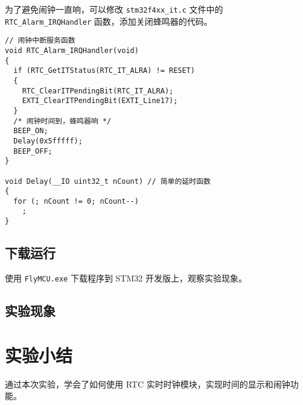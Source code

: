 \documentclass{course-thesis/theme-2639013}
\begin{document}
为了避免闹钟一直响，可以修改 \texttt{stm32f4xx\_it.c} 文件中的 \texttt{ RTC\_Alarm\_IRQHandler} 函数，添加关闭蜂鸣器的代码。

\begin{verbatim}
// 闹钟中断服务函数
void RTC_Alarm_IRQHandler(void)
{
  if (RTC_GetITStatus(RTC_IT_ALRA) != RESET)
  {
    RTC_ClearITPendingBit(RTC_IT_ALRA);
    EXTI_ClearITPendingBit(EXTI_Line17);
  }
  /* 闹钟时间到，蜂鸣器响 */
  BEEP_ON;
  Delay(0x5fffff);
  BEEP_OFF;
}

void Delay(__IO uint32_t nCount) // 简单的延时函数
{
  for (; nCount != 0; nCount--)
    ;
}
\end{verbatim}

\subsection{下载运行}

使用 \texttt{FlyMCU.exe} 下载程序到 STM32 开发版上，观察实验现象。

\subsection{实验现象}

\section{实验小结}

通过本次实验，学会了如何使用 RTC 实时时钟模块，实现时间的显示和闹钟功能。
\end{document}
